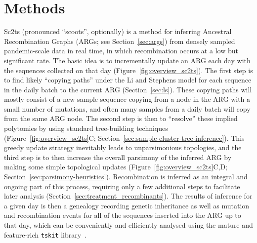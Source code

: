 \documentclass{article}
\begin{document}
\section{Methods}
Sc2ts (pronounced ``scoots'', optionally) is a method for inferring
Ancestral Recombination Graphs (ARGs; see Section~\ref{sec:args})
from densely sampled pandemic-scale data
in real time, in which recombination occurs at a low but significant rate.
The basic idea is to incrementally update an ARG each day
with the sequences collected on that day (Figure~\ref{fig:overview_sc2ts}).
The first step is to find likely ``copying paths'' under the Li and Stephens model
for each sequence in the daily batch to the current ARG (Section~\ref{sec:ls}).
These copying paths
will mostly consist of a new sample sequence copying from a node in the ARG
with a small number of mutations, and often many samples
from a daily batch will copy from the same ARG node.
The second step is then to ``resolve'' these implied polytomies by using
standard tree-building techniques (Figure~\ref{fig:overview_sc2ts}C;
Section~\ref{sec:sample-cluster-tree-inference}).
This greedy update strategy inevitably leads to unparsimonious
topologies, and the third step is to then increase the
overall parsimony of the inferred ARG by making some simple topological
updates (Figure~\ref{fig:overview_sc2ts}C,D;
Section~\ref{sec:parsimony-heuristics}).
Recombination is inferred as an integral and ongoing part of this
process, requiring only a few additional steps to facilitate
later analysis (Section~\ref{sec:treatment_recombinants}).
The results of inference for a given day is then
a genealogy recording genetic inheritance as well as 
mutation and recombination events
for all of the sequences inserted into the ARG up to that day,
which can be conveniently and efficiently analysed using the
mature and feature-rich
\texttt{tskit}
library~\citep{Kelleher2018-xc,Ralph2020-efficiently,Tskit2023-tskit}.
\end{document}
